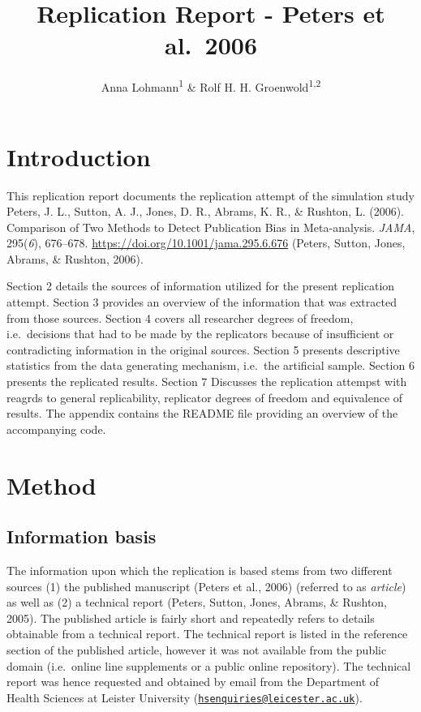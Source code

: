 \documentclass[
  english,
  doc,floatsintext,draftall]{apa6}
\title{Replication Report - Peters et al.~2006}
\author{Anna Lohmann\textsuperscript{1} \& Rolf H. H. Groenwold\textsuperscript{1,2}}
\date{}
\affiliation{\vspace{0.5cm}\textsuperscript{1,2} Leiden University Medical Center}
\begin{document}
\maketitle

\hypertarget{introduction}{%
\section{Introduction}\label{introduction}}

This replication report documents the replication attempt of the simulation study Peters, J. L., Sutton, A. J., Jones, D. R., Abrams, K. R., \& Rushton, L. (2006). Comparison of Two Methods to Detect Publication Bias in Meta-analysis. \emph{JAMA}, 295(\emph{6}), 676--678. \url{https://doi.org/10.1001/jama.295.6.676} (Peters, Sutton, Jones, Abrams, \& Rushton, 2006).

Section 2 details the sources of information utilized for the present replication attempt.
Section 3 provides an overview of the information that was extracted from those sources.
Section 4 covers all researcher degrees of freedom, i.e.~decisions that had to be made by the replicators because of insufficient or contradicting information in the original sources.
Section 5 presents descriptive statistics from the data generating mechanism, i.e.~the artificial sample.
Section 6 presents the replicated results.
Section 7 Discusses the replication attempst with reagrds to general replicability, replicator degrees of freedom and equivalence of results.
The appendix contains the README file providing an overview of the accompanying code.

\hypertarget{method}{%
\section{Method}\label{method}}

\hypertarget{information-basis}{%
\subsection{Information basis}\label{information-basis}}

The information upon which the replication is based stems from two different sources (1) the published manuscript (Peters et al., 2006) (referred to as \emph{article}) as well as (2) a technical report (Peters, Sutton, Jones, Abrams, \& Rushton, 2005).
The published article is fairly short and repeatedly refers to details obtainable from a technical report.
The technical report is listed in the reference section of the published article, however it was not available from the public domain (i.e.~online line supplements or a public online repository).
The technical report was hence requested and obtained by email from the Department of Health Sciences at Leister University (\href{mailto:hsenquiries@leicester.ac.uk}{\nolinkurl{hsenquiries@leicester.ac.uk}}).
\end{document}
